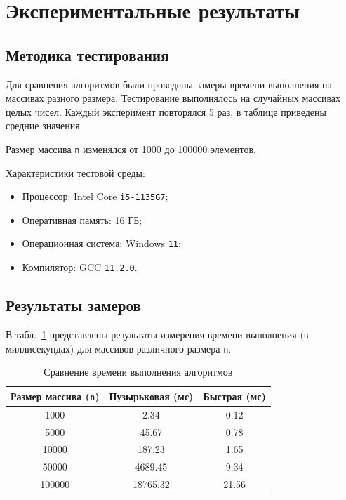\section{Экспериментальные результаты}

\subsection{Методика тестирования}

Для сравнения алгоритмов были проведены замеры времени выполнения на массивах разного размера. Тестирование выполнялось на случайных массивах целых чисел. Каждый эксперимент повторялся 5 раз, в таблице приведены средние значения.

Размер массива \texttt{n} изменялся от 1000 до 100000 элементов.

Характеристики тестовой среды:
\begin{itemize}
    \item Процессор: Intel Core \texttt{i5-1135G7};
    \item Оперативная память: 16 ГБ;
    \item Операционная система: Windows \texttt{11};
    \item Компилятор: GCC \texttt{11.2.0}.
\end{itemize}

\subsection{Результаты замеров}

В табл.~\ref{tab:time} представлены результаты измерения времени выполнения (в миллисекундах) для массивов различного размера \texttt{n}.

\begin{table}[H]
\centering
\caption{Сравнение времени выполнения алгоритмов}
\label{tab:time}
\begin{tabular}{|c|c|c|}
\hline
\textbf{Размер массива (\texttt{n})} & \textbf{Пузырьковая (мс)} & \textbf{Быстрая (мс)} \\
\hline
1000 & 2.34 & 0.12 \\
\hline
5000 & 45.67 & 0.78 \\
\hline
10000 & 187.23 & 1.65 \\
\hline
50000 & 4689.45 & 9.34 \\
\hline
100000 & 18765.32 & 21.56 \\
\hline
\end{tabular}
\end{table}

